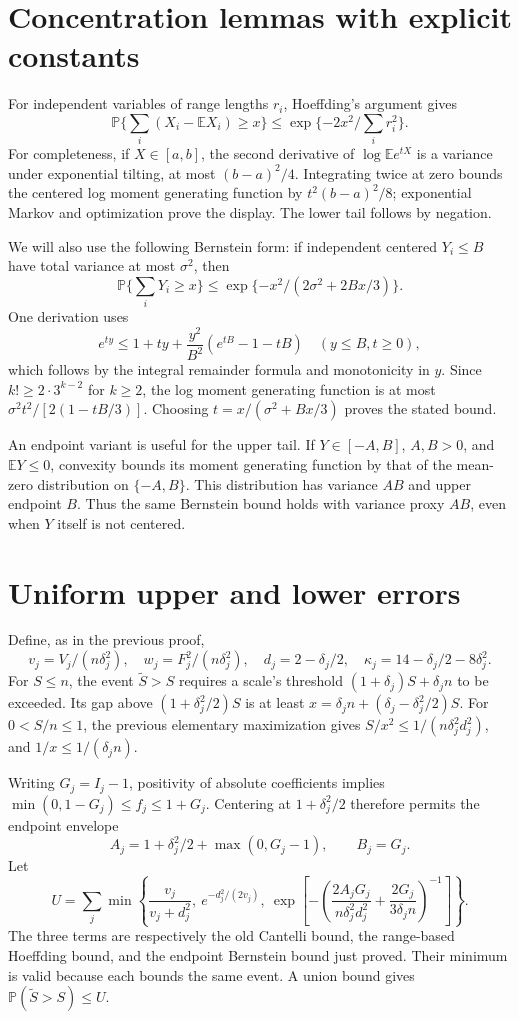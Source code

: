 \documentclass[10pt]{article}
\newcommand{\E}{\mathbb E}
\newcommand{\Prb}{\mathbb P}
\begin{document}
\section{Concentration lemmas with explicit constants}
For independent variables of range lengths $r_i$, Hoeffding's argument gives
\[
 \Prb\{\textstyle\sum_i(X_i-\E X_i)\ge x\}
 \le\exp\{-2x^2/\textstyle\sum_i r_i^2\}.
\]
For completeness, if $X\in[a,b]$, the second derivative of
$\log\E e^{tX}$ is a variance under exponential tilting, at most
$(b-a)^2/4$. Integrating twice at zero bounds the centered log moment
generating function by $t^2(b-a)^2/8$; exponential Markov and optimization
prove the display. The lower tail follows by negation.

We will also use the following Bernstein form: if independent centered
$Y_i\le B$ have total variance at most $\sigma^2$, then
\[
 \Prb\{\textstyle\sum_iY_i\ge x\}
 \le\exp\{-x^2/(2\sigma^2+2Bx/3)\}.
\]
One derivation uses
\[
 e^{ty}\le1+ty+\frac{y^2}{B^2}(e^{tB}-1-tB)\quad(y\le B,t\ge0),
\]
which follows by the integral remainder formula and monotonicity in $y$.
Since $k!\ge2\cdot3^{k-2}$ for $k\ge2$, the log moment generating
function is at most $\sigma^2t^2/[2(1-tB/3)]$. Choosing
$t=x/(\sigma^2+Bx/3)$ proves the stated bound.

An endpoint variant is useful for the upper tail. If $Y\in[-A,B]$,
$A,B>0$, and $\E Y\le0$, convexity bounds its moment generating function
by that of the mean-zero distribution on $\{-A,B\}$. This distribution
has variance $AB$ and upper endpoint $B$. Thus the same Bernstein bound
holds with variance proxy $AB$, even when $Y$ itself is not centered.

\section{Uniform upper and lower errors}
Define, as in the previous proof,
\[
 v_j=V_j/(n\delta_j^2),\quad w_j=F_j^2/(n\delta_j^2),\quad
 d_j=2-\delta_j/2,\quad\kappa_j=14-\delta_j/2-8\delta_j^2.
\]
For $S\le n$, the event $\widetilde S>S$ requires a scale's threshold
$(1+\delta_j)S+\delta_j n$ to be exceeded. Its gap above
$(1+\delta_j^2/2)S$ is at least
$x=\delta_j n+(\delta_j-\delta_j^2/2)S$.
For $0<S/n\le1$, the previous elementary maximization gives
$S/x^2\le1/(n\delta_j^2d_j^2)$, and $1/x\le1/(\delta_j n)$.

Writing $G_j=I_j-1$, positivity of absolute coefficients implies
$\min(0,1-G_j)\le f_j\le1+G_j$. Centering at
$1+\delta_j^2/2$ therefore permits the endpoint envelope
\[
 A_j=1+\delta_j^2/2+\max(0,G_j-1),\qquad B_j=G_j.
\]
Let
\[
 U=\sum_j\min\left\{
 \frac{v_j}{v_j+d_j^2},\ e^{-d_j^2/(2v_j)},\
 \exp\left[-\left(\frac{2A_jG_j}{n\delta_j^2d_j^2}
                  +\frac{2G_j}{3\delta_j n}\right)^{-1}\right]\right\}.
\]
The three terms are respectively the old Cantelli bound, the range-based
Hoeffding bound, and the endpoint Bernstein bound just proved. Their minimum
is valid because each bounds the same event. A union bound gives
$\Prb(\widetilde S>S)\le U$.
\end{document}
